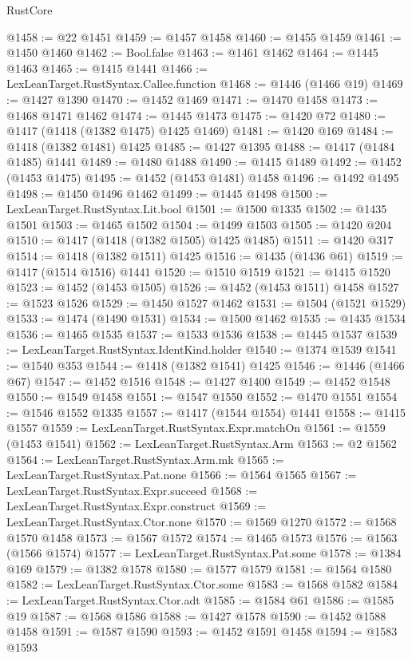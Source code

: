 \begin{lexlean}{RustCore}
\begin{coremodule}
@1458 := @22 @1451
@1459 := @1457 @1458
@1460 := @1455 @1459
@1461 := @1450 @1460
@1462 := Bool.false
@1463 := @1461 @1462
@1464 := @1445 @1463
@1465 := @1415 @1441
@1466 := LexLeanTarget.RustSyntax.Callee.function
@1468 := @1446 (@1466 @19)
@1469 := @1427 @1390
@1470 := @1452 @1469
@1471 := @1470 @1458
@1473 := @1468 @1471 @1462
@1474 := @1445 @1473
@1475 := @1420 @72
@1480 := @1417 (@1418 (@1382 @1475) @1425 @1469)
@1481 := @1420 @169
@1484 := @1418 (@1382 @1481) @1425
@1485 := @1427 @1395
@1488 := @1417 (@1484 @1485) @1441
@1489 := @1480 @1488
@1490 := @1415 @1489
@1492 := @1452 (@1453 @1475)
@1495 := @1452 (@1453 @1481) @1458
@1496 := @1492 @1495
@1498 := @1450 @1496 @1462
@1499 := @1445 @1498
@1500 := LexLeanTarget.RustSyntax.Lit.bool
@1501 := @1500 @1335
@1502 := @1435 @1501
@1503 := @1465 @1502
@1504 := @1499 @1503
@1505 := @1420 @204
@1510 := @1417 (@1418 (@1382 @1505) @1425 @1485)
@1511 := @1420 @317
@1514 := @1418 (@1382 @1511) @1425
@1516 := @1435 (@1436 @61)
@1519 := @1417 (@1514 @1516) @1441
@1520 := @1510 @1519
@1521 := @1415 @1520
@1523 := @1452 (@1453 @1505)
@1526 := @1452 (@1453 @1511) @1458
@1527 := @1523 @1526
@1529 := @1450 @1527 @1462
@1531 := @1504 (@1521 @1529)
@1533 := @1474 (@1490 @1531)
@1534 := @1500 @1462
@1535 := @1435 @1534
@1536 := @1465 @1535
@1537 := @1533 @1536
@1538 := @1445 @1537
@1539 := LexLeanTarget.RustSyntax.IdentKind.holder
@1540 := @1374 @1539
@1541 := @1540 @353
@1544 := @1418 (@1382 @1541) @1425
@1546 := @1446 (@1466 @67)
@1547 := @1452 @1516
@1548 := @1427 @1400
@1549 := @1452 @1548
@1550 := @1549 @1458
@1551 := @1547 @1550
@1552 := @1470 @1551
@1554 := @1546 @1552 @1335
@1557 := @1417 (@1544 @1554) @1441
@1558 := @1415 @1557
@1559 := LexLeanTarget.RustSyntax.Expr.matchOn
@1561 := @1559 (@1453 @1541)
@1562 := LexLeanTarget.RustSyntax.Arm
@1563 := @2 @1562
@1564 := LexLeanTarget.RustSyntax.Arm.mk
@1565 := LexLeanTarget.RustSyntax.Pat.none
@1566 := @1564 @1565
@1567 := LexLeanTarget.RustSyntax.Expr.succeed
@1568 := LexLeanTarget.RustSyntax.Expr.construct
@1569 := LexLeanTarget.RustSyntax.Ctor.none
@1570 := @1569 @1270
@1572 := @1568 @1570 @1458
@1573 := @1567 @1572
@1574 := @1465 @1573
@1576 := @1563 (@1566 @1574)
@1577 := LexLeanTarget.RustSyntax.Pat.some
@1578 := @1384 @169
@1579 := @1382 @1578
@1580 := @1577 @1579
@1581 := @1564 @1580
@1582 := LexLeanTarget.RustSyntax.Ctor.some
@1583 := @1568 @1582
@1584 := LexLeanTarget.RustSyntax.Ctor.adt
@1585 := @1584 @61
@1586 := @1585 @19
@1587 := @1568 @1586
@1588 := @1427 @1578
@1590 := @1452 @1588 @1458
@1591 := @1587 @1590
@1593 := @1452 @1591 @1458
@1594 := @1583 @1593

\end{coremodule}
\end{lexlean}
